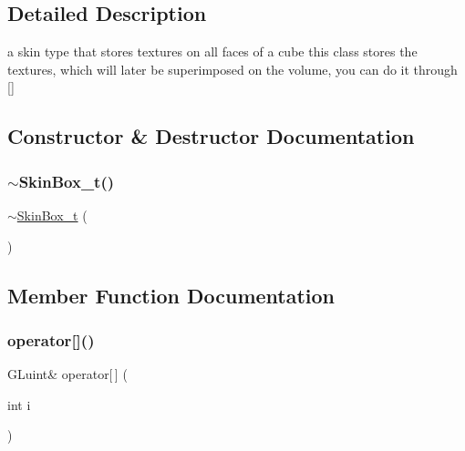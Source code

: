 \subsection{Detailed Description}
a skin type that stores textures on all faces of a cube this class stores the textures, which will later be superimposed on the volume, you can do it through \mbox{[}\mbox{]} 

\subsection{Constructor \& Destructor Documentation}
\mbox{\label{classSkinBox__t_a68340e27a7ff173ac40652814a37b95b}} 
\subsubsection{\texorpdfstring{$\sim$\+Skin\+Box\+\_\+t()}{~SkinBox\_t()}}
{\footnotesize\ttfamily $\sim$\hyperlink{classSkinBox__t}{Skin\+Box\+\_\+t} (\begin{DoxyParamCaption}{ }\end{DoxyParamCaption})\hspace{0.3cm}{\ttfamily [inline]}}



\subsection{Member Function Documentation}
\mbox{\label{classSkinBox__t_ae4bc2b4e970e3dd642b0f06489412b2f}} 
\subsubsection{\texorpdfstring{operator[]()}{operator[]()}}
{\footnotesize\ttfamily G\+Luint\& operator\mbox{[}$\,$\mbox{]} (\begin{DoxyParamCaption}\item[{int}]{i }\end{DoxyParamCaption})\hspace{0.3cm}{\ttfamily [inline]}}



